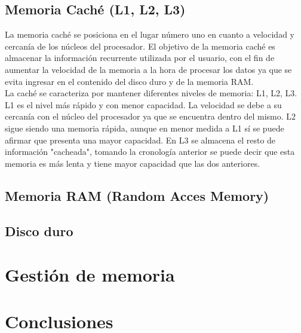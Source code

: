 \documentclass{article}
\begin{document}
\subsection{Memoria Caché (L1, L2, L3)}

La memoria caché se posiciona en el lugar número uno en cuanto a velocidad y cercanía de los núcleos del procesador. El objetivo de la memoria caché es almacenar la información recurrente utilizada por el usuario, con el fin de aumentar la velocidad de la memoria a la hora de procesar los datos ya que se evita ingresar en el contenido del disco duro y de la memoria RAM.\\

La caché se caracteriza por mantener diferentes niveles de memoria: L1, L2, L3.
L1 es el nivel más rápido y con menor capacidad. La velocidad se debe a su cercanía con el núcleo del procesador ya que se encuentra dentro del mismo.
L2 sigue siendo una memoria rápida, aunque en menor medida a L1 sí se puede afirmar que presenta una mayor capacidad.
En L3 se almacena el resto de información "cacheada", tomando la cronología anterior se puede decir que esta memoria es más lenta y tiene mayor capacidad que las dos anteriores.

\subsection{Memoria RAM (Random Acces Memory)}



\subsection{Disco duro}


\section{Gestión de memoria}

\section{Conclusiones}




\end{document}
